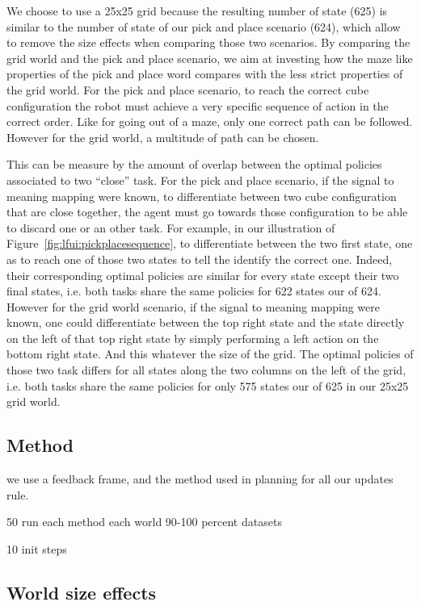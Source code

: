 We choose to use a 25x25 grid because the resulting number of state (625) is similar to the number of state of our pick and place scenario (624), which allow to remove the size effects when comparing those two scenarios. By comparing the grid world and the pick and place scenario, we aim at investing how the maze like properties of the pick and place word compares with the less strict properties of the grid world. For the pick and place scenario, to reach the correct cube configuration the robot must achieve a very specific sequence of action in the correct order. Like for going out of a maze, only one correct path can be followed. However for the grid world, a multitude of path can be chosen. 

This can be measure by the amount of overlap between the optimal policies associated to two ``close'' task. For the pick and place scenario, if the signal to meaning mapping were known, to differentiate between two cube configuration that are close together, the agent must go towards those configuration to be able to discard one or an other task. For example, in our illustration of Figure~\ref{fig:lfui:pickplacesequence}, to differentiate between the two first state, one as to reach one of those two states to tell the identify the correct one. Indeed, their corresponding optimal policies are similar for every state except their two final states, i.e. both tasks share the same policies for 622 states our of 624. However for the grid world scenario, if the signal to meaning mapping were known, one could differentiate between the top right state and the state directly on the left of that top right state by simply performing a left action on the bottom right state. And this whatever the size of the grid. The optimal policies of those two task differs for all states along the two columns on the left of the grid, i.e. both tasks share the same policies for only 575 states our of 625 in our 25x25 grid world.

\subsection{Method}

we use a feedback frame, and the method used in planning for all our updates rule.

50 run each method each world
90-100 percent datasets

10 init steps

\subsection{World size effects}


